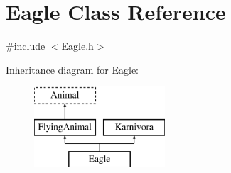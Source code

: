 \hypertarget{classEagle}{\section{Eagle Class Reference}
\label{classEagle}
}


{\ttfamily \#include $<$Eagle.\-h$>$}

Inheritance diagram for Eagle\-:\begin{figure}[H]
\begin{center}
\leavevmode
\includegraphics[height=3.000000cm]{classEagle}
\end{center}
\end{figure}
